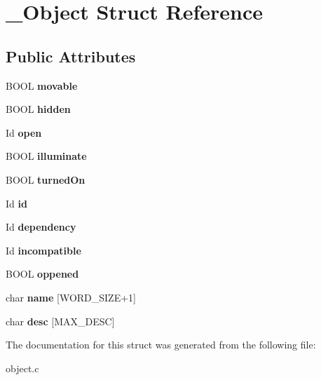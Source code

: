 \hypertarget{struct__Object}{}\section{\+\_\+\+Object Struct Reference}
\label{struct__Object}
\subsection*{Public Attributes}
\begin{DoxyCompactItemize}
\item 
\mbox{\label{struct__Object_ae013850f78da07c39e530f36bf98f2b9}} 
B\+O\+OL {\bfseries movable}
\item 
\mbox{\label{struct__Object_a44824966fc9f4d5f82c189b2e063ddc4}} 
B\+O\+OL {\bfseries hidden}
\item 
\mbox{\label{struct__Object_a0922dd9891e6aa617ce1d51ae27c0175}} 
Id {\bfseries open}
\item 
\mbox{\label{struct__Object_a6e4edc37e6d8a5237a501c432a4296ca}} 
B\+O\+OL {\bfseries illuminate}
\item 
\mbox{\label{struct__Object_aa447a4dd98c8c66f485ede35d02ea3a9}} 
B\+O\+OL {\bfseries turned\+On}
\item 
\mbox{\label{struct__Object_a3cff7a0e8dc4e9d23895ed9af1b7653a}} 
Id {\bfseries id}
\item 
\mbox{\label{struct__Object_afec53e4289e64d19508e1f04c93de411}} 
Id {\bfseries dependency}
\item 
\mbox{\label{struct__Object_a2811b54563806d9ed618af6a78114898}} 
Id {\bfseries incompatible}
\item 
\mbox{\label{struct__Object_a4d4d8c9fee256f5fa07dd42279d43ff5}} 
B\+O\+OL {\bfseries oppened}
\item 
\mbox{\label{struct__Object_a03fb9b8d91f071e8e30d669be79cc040}} 
char {\bfseries name} \mbox{[}W\+O\+R\+D\+\_\+\+S\+I\+ZE+1\mbox{]}
\item 
\mbox{\label{struct__Object_a7665331ab1dc4de1c3ab1cdebaf7c03f}} 
char {\bfseries desc} \mbox{[}M\+A\+X\+\_\+\+D\+E\+SC\mbox{]}
\end{DoxyCompactItemize}


The documentation for this struct was generated from the following file\+:\begin{DoxyCompactItemize}
\item 
object.\+c\end{DoxyCompactItemize}
